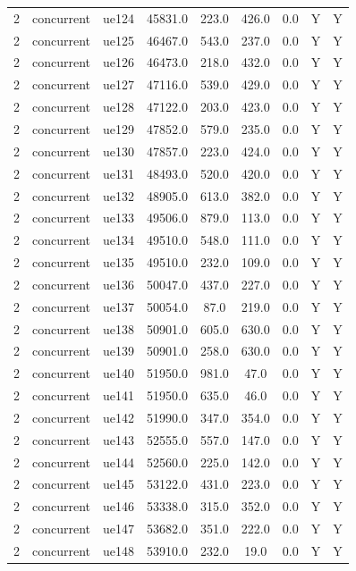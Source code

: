\begin{table}[ht]
\begin{tabular}{|c|c|c|c|c|c|c|c|c|}
2 & concurrent & ue124 & 45831.0 & 223.0 & 426.0 & 0.0 & Y & Y \\
2 & concurrent & ue125 & 46467.0 & 543.0 & 237.0 & 0.0 & Y & Y \\
2 & concurrent & ue126 & 46473.0 & 218.0 & 432.0 & 0.0 & Y & Y \\
2 & concurrent & ue127 & 47116.0 & 539.0 & 429.0 & 0.0 & Y & Y \\
2 & concurrent & ue128 & 47122.0 & 203.0 & 423.0 & 0.0 & Y & Y \\
2 & concurrent & ue129 & 47852.0 & 579.0 & 235.0 & 0.0 & Y & Y \\
2 & concurrent & ue130 & 47857.0 & 223.0 & 424.0 & 0.0 & Y & Y \\
2 & concurrent & ue131 & 48493.0 & 520.0 & 420.0 & 0.0 & Y & Y \\
2 & concurrent & ue132 & 48905.0 & 613.0 & 382.0 & 0.0 & Y & Y \\
2 & concurrent & ue133 & 49506.0 & 879.0 & 113.0 & 0.0 & Y & Y \\
2 & concurrent & ue134 & 49510.0 & 548.0 & 111.0 & 0.0 & Y & Y \\
2 & concurrent & ue135 & 49510.0 & 232.0 & 109.0 & 0.0 & Y & Y \\
2 & concurrent & ue136 & 50047.0 & 437.0 & 227.0 & 0.0 & Y & Y \\
2 & concurrent & ue137 & 50054.0 & 87.0 & 219.0 & 0.0 & Y & Y \\
2 & concurrent & ue138 & 50901.0 & 605.0 & 630.0 & 0.0 & Y & Y \\
2 & concurrent & ue139 & 50901.0 & 258.0 & 630.0 & 0.0 & Y & Y \\
2 & concurrent & ue140 & 51950.0 & 981.0 & 47.0 & 0.0 & Y & Y \\
2 & concurrent & ue141 & 51950.0 & 635.0 & 46.0 & 0.0 & Y & Y \\
2 & concurrent & ue142 & 51990.0 & 347.0 & 354.0 & 0.0 & Y & Y \\
2 & concurrent & ue143 & 52555.0 & 557.0 & 147.0 & 0.0 & Y & Y \\
2 & concurrent & ue144 & 52560.0 & 225.0 & 142.0 & 0.0 & Y & Y \\
2 & concurrent & ue145 & 53122.0 & 431.0 & 223.0 & 0.0 & Y & Y \\
2 & concurrent & ue146 & 53338.0 & 315.0 & 352.0 & 0.0 & Y & Y \\
2 & concurrent & ue147 & 53682.0 & 351.0 & 222.0 & 0.0 & Y & Y \\
2 & concurrent & ue148 & 53910.0 & 232.0 & 19.0 & 0.0 & Y & Y \\

\end{tabular}
\end{table}
